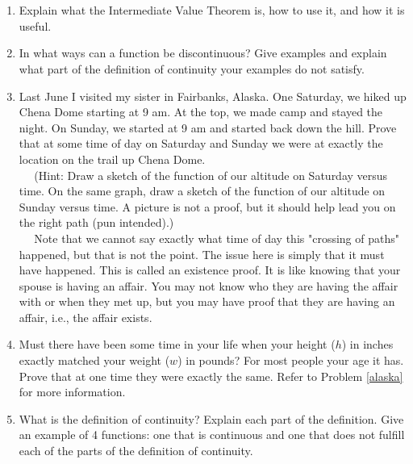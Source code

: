 \section{}
\begin{enumerate}



\item  Explain what the Intermediate Value Theorem is, how to use it, and how it is useful. 

\item  In what ways can a function be discontinuous?  Give examples and explain what part of the definition of continuity your examples do not satisfy. 


\item  \label{alaska} Last June I visited my sister in Fairbanks, Alaska.  One Saturday, we hiked up Chena Dome starting at 9 am.  At the top, we made camp and stayed the night.  On Sunday, we started at 9 am and started back down the hill.  Prove that at some time of day on Saturday and Sunday we were at exactly the location on the trail up Chena Dome.\\ 
	$\mbox{}\ \ \ \ \ \ $(Hint:  Draw a sketch of the function of our altitude on Saturday versus time.  On the same graph, draw a sketch of the function of our altitude on Sunday versus time.  A picture is not a proof, but it should help lead you on the right path (pun intended).)\\ 
	$\mbox{}\ \ \ \ \ \ $Note that we cannot say exactly what time of day this "crossing of paths" happened, but that is not the point.  The issue here is simply that it must have happened.  This is called an existence proof.  It is like knowing that your spouse is having an affair.  You may not know who they are having the affair with or when they met up, but you may have proof that they are having an affair, i.e., the affair exists. 

\item  Must there have been some time in your life when your height ($h$) in inches exactly matched your weight ($w$) in pounds?  For most people your age it has.  Prove that at one time they were exactly the same.   Refer to Problem \ref{alaska} for more information. 


\item  What is the definition of continuity?  Explain each part of the definition.  Give an example of 4 functions:  one that is continuous and one that does not fulfill each of the parts of the definition of continuity. 


\end{enumerate}
